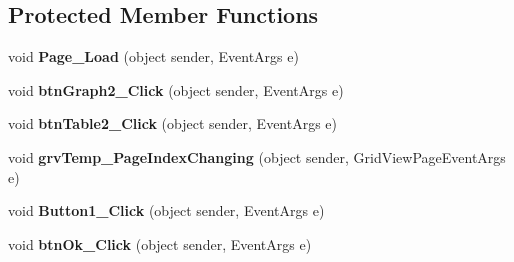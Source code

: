 \subsection*{Protected Member Functions}
\begin{DoxyCompactItemize}
\item 
\hypertarget{classusertrackmyhealth__bodymeasurement_aa7aa3928ae1b1230cc3ad2cc8e24e05b}{void {\bfseries Page\-\_\-\-Load} (object sender, Event\-Args e)}\label{classusertrackmyhealth__bodymeasurement_aa7aa3928ae1b1230cc3ad2cc8e24e05b}

\item 
\hypertarget{classusertrackmyhealth__bodymeasurement_a0f7be178c259b0f7963c753f26520305}{void {\bfseries btn\-Graph2\-\_\-\-Click} (object sender, Event\-Args e)}\label{classusertrackmyhealth__bodymeasurement_a0f7be178c259b0f7963c753f26520305}

\item 
\hypertarget{classusertrackmyhealth__bodymeasurement_a8b0019e124c30c6ba41662982ec1a89a}{void {\bfseries btn\-Table2\-\_\-\-Click} (object sender, Event\-Args e)}\label{classusertrackmyhealth__bodymeasurement_a8b0019e124c30c6ba41662982ec1a89a}

\item 
\hypertarget{classusertrackmyhealth__bodymeasurement_a8ca108cb6651d5f593b6a91920ebefb3}{void {\bfseries grv\-Temp\-\_\-\-Page\-Index\-Changing} (object sender, Grid\-View\-Page\-Event\-Args e)}\label{classusertrackmyhealth__bodymeasurement_a8ca108cb6651d5f593b6a91920ebefb3}

\item 
\hypertarget{classusertrackmyhealth__bodymeasurement_a1ce85222922590c4ff246745e1338a98}{void {\bfseries Button1\-\_\-\-Click} (object sender, Event\-Args e)}\label{classusertrackmyhealth__bodymeasurement_a1ce85222922590c4ff246745e1338a98}

\item 
\hypertarget{classusertrackmyhealth__bodymeasurement_afea29cbb91d8dabcab9e58775f0680ce}{void {\bfseries btn\-Ok\-\_\-\-Click} (object sender, Event\-Args e)}\label{classusertrackmyhealth__bodymeasurement_afea29cbb91d8dabcab9e58775f0680ce}


\end{DoxyCompactItemize}
